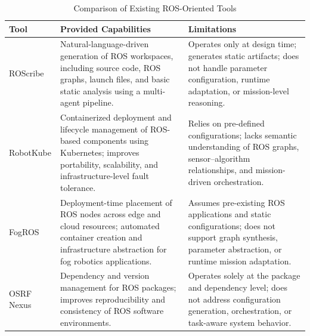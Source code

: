 \begin{table}[H]
\centering
\caption{Comparison of Existing ROS-Oriented Tools}
\label{tab:ros_tools_comparison}
\renewcommand{\arraystretch}{1.3}
\begin{tabular}{|p{3cm}|p{5.5cm}|p{5.5cm}|}
\hline
\textbf{Tool} & \textbf{Provided Capabilities} & \textbf{Limitations} \\
\hline

ROScribe &
Natural-language-driven generation of ROS workspaces, including source code, ROS graphs, launch files, and basic static analysis using a multi-agent pipeline. &
Operates only at design time; generates static artifacts; does not handle parameter configuration, runtime adaptation, or mission-level reasoning. \\
\hline

RobotKube &
Containerized deployment and lifecycle management of ROS-based components using Kubernetes; improves portability, scalability, and infrastructure-level fault tolerance. &
Relies on pre-defined configurations; lacks semantic understanding of ROS graphs, sensor--algorithm relationships, and mission-driven orchestration. \\
\hline

FogROS &
Deployment-time placement of ROS nodes across edge and cloud resources; automated container creation and infrastructure abstraction for fog robotics applications. &
Assumes pre-existing ROS applications and static configurations; does not support graph synthesis, parameter abstraction, or runtime mission adaptation. \\
\hline

OSRF Nexus &
Dependency and version management for ROS packages; improves reproducibility and consistency of ROS software environments. &
Operates solely at the package and dependency level; does not address configuration generation, orchestration, or task-aware system behavior. \\
\hline

\end{tabular}
\end{table}

